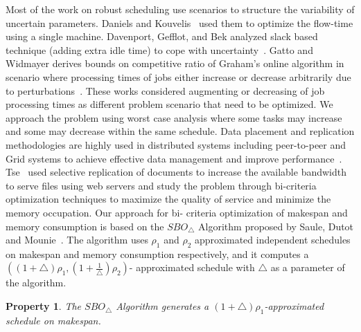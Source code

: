 \documentclass[12pt]{article}
\theoremstyle{mystyle}
\newtheorem{property}[theorem]{Property}
\begin{document}
   Most of the work on robust scheduling use scenarios to structure
   the variability of uncertain parameters. Daniels and
   Kouvelis~\cite{citeulike:8334169} used them to optimize the flow-time
   using a single machine. Davenport, Gefflot, and Bek analyzed slack
   based technique (adding extra idle time) to cope with
   uncertainty~\cite{Davenport_slack-basedtechniques}. Gatto and Widmayer
   derives bounds on competitive ratio of Graham’s online algorithm in
   scenario where processing times of jobs either increase or decrease
   arbitrarily due to perturbations~\cite{Gatto07}.  These works
   considered augmenting or decreasing of job processing times as
   different problem scenario that need to be optimized. We 
   approach the problem using worst case analysis where some tasks may
   increase and some may decrease within the same schedule.
   Data placement and replication methodologies are highly used in
   distributed systems including peer-to-peer and Grid systems to achieve
   effective data management and improve
   performance~\cite{Cirne2007213}\cite{Abawajy}\cite{4215379}. Tse~\cite{DBLP:journals/tc/Tse12}
   used selective replication of documents to increase the available
   bandwidth to serve files using web servers and study the problem
   through bi-criteria optimization techniques to maximize the quality of
   service and minimize the memory occupation. Our approach for bi- criteria optimization of makespan and memory consumption is based on the $ SBO_{\triangle}$ Algorithm proposed by Saule, Dutot and Mounie~\cite{10.1109/IPDPS.2008.4536292}. The algorithm uses  $\rho_1$ and $\rho_2$ approximated independent schedules on makespan and memory consumption respectively, and it computes a $((1+\triangle)\rho_1 , (1+\frac{1}{\triangle})\rho_2 )$- approximated schedule with $\triangle$ as a parameter of the algorithm.
   \begin{property}\cite{10.1109/IPDPS.2008.4536292}
   The $SBO_\triangle$ Algorithm generates a $ (1+\triangle)  \rho_1$-approximated schedule on makespan.
   \end{property}         
\end{document}
